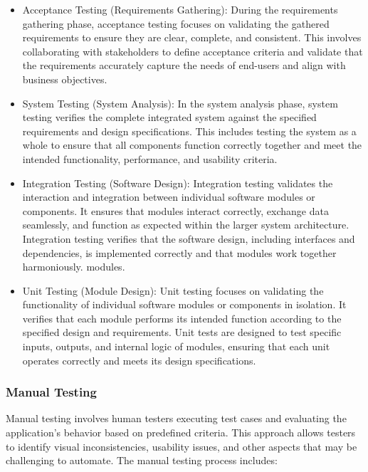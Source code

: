 		\begin{itemize}
			\item Acceptance Testing (Requirements Gathering): During the requirements gathering phase, acceptance testing focuses on validating the gathered requirements to ensure they are clear, complete, and consistent. This involves collaborating with stakeholders to define acceptance criteria and validate that the requirements accurately capture the needs of end-users and align with business objectives.
			\item System Testing (System Analysis): In the system analysis phase, system testing verifies the complete integrated system against the specified requirements and design specifications. This includes testing the system as a whole to ensure that all components function correctly together and meet the intended functionality, performance, and usability criteria.
			\item Integration Testing (Software Design): Integration testing validates the interaction and integration between individual software modules or components. It ensures that modules interact correctly, exchange data seamlessly, and function as expected within the larger system architecture. Integration testing verifies that the software design, including interfaces and dependencies, is implemented correctly and that modules work together harmoniously.
			modules.
			\item Unit Testing (Module Design): Unit testing focuses on validating the functionality of individual software modules or components in isolation. It verifies that each module performs its intended function according to the specified design and requirements. Unit tests are designed to test specific inputs, outputs, and internal logic of modules, ensuring that each unit operates correctly and meets its design specifications.
		\end{itemize}

		\subsubsection{Manual Testing}
		
		Manual testing involves human testers executing test cases and evaluating the application's behavior based on predefined criteria. This approach allows testers to identify visual inconsistencies, usability issues, and other aspects that may be challenging to automate. The manual testing process includes:
		
